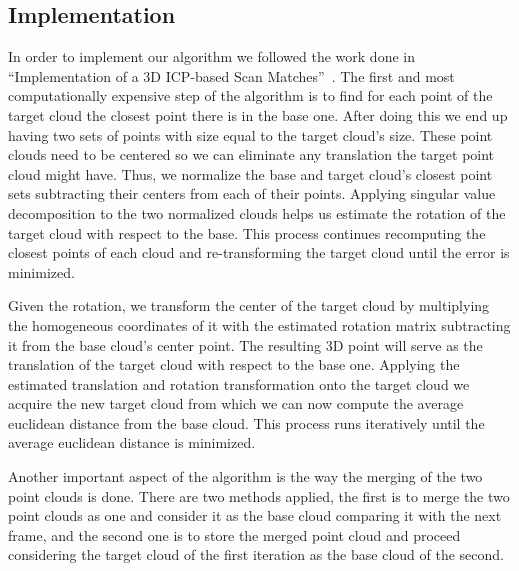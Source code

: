 \subsection{Implementation}
In order to implement our algorithm we followed the work done in ``Implementation of a 3D ICP-based Scan Matches''~\cite{icpImp}. The first and most computationally expensive step of the algorithm is to find for each point of the target cloud the closest point there is in the base one. After doing this we end up having two sets of points with size equal to the target cloud's size. These point clouds need to be centered so we can eliminate any translation the target point cloud might have. Thus, we normalize the base and target cloud's closest point sets subtracting their centers from each of their points. Applying singular value decomposition to the two normalized clouds helps us estimate the rotation of the target cloud with respect to the base. This process continues recomputing the closest points of each cloud and re-transforming the target cloud until the error is minimized.

Given the rotation, we transform the center of the target cloud by multiplying the homogeneous coordinates of it with the estimated rotation matrix subtracting it from the base cloud's center point. The resulting 3D point will serve as the translation of the target cloud with respect to the base one. Applying the estimated translation and rotation transformation onto the target cloud we acquire the new target cloud from which we can now compute the average euclidean distance from the base cloud. This process runs iteratively until the average euclidean distance is minimized.

Another important aspect of the algorithm is the way the merging of the two point clouds is done. There are two methods applied, the first is to merge the two point clouds as one and consider it as the base cloud comparing it with the next frame, and the second one is to store the merged point cloud and proceed considering the target cloud of the first iteration as the base cloud of the second.



